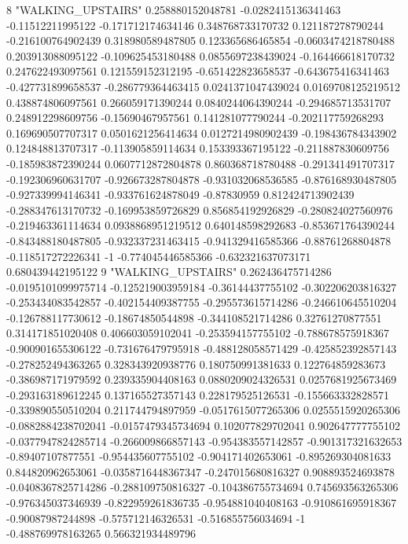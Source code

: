 8 "WALKING_UPSTAIRS" 0.258880152048781 -0.0282415136341463 -0.11512211995122 -0.171712174634146 0.348768733170732 0.121187278790244 -0.216100764902439 0.318980589487805 0.123365686465854 -0.0603474218780488 0.203913088095122 -0.109625453180488 0.0855697238439024 -0.164466618170732 0.247622493097561 0.121559152312195 -0.651422823658537 -0.643675416341463 -0.427731899658537 -0.286779364463415 0.0241371047439024 0.0169708125219512 0.438874806097561 0.266059171390244 0.0840244064390244 -0.294685713531707 0.248912298609756 -0.15690467957561 0.141281077790244 -0.202117759268293 0.169690507707317 0.0501621256414634 0.0127214980902439 -0.198436784343902 0.124848813707317 -0.113905859114634 0.153393367195122 -0.211887830609756 -0.185983872390244 0.0607712872804878 0.860368718780488 -0.291341491707317 -0.192306960631707 -0.926673287804878 -0.931032068536585 -0.876168930487805 -0.927339994146341 -0.933761624878049 -0.87830959 0.812424713902439 -0.288347613170732 -0.169953859726829 0.856854192926829 -0.280824027560976 -0.219463361114634 0.0938868951219512 0.640148598292683 -0.853671764390244 -0.843488180487805 -0.932337231463415 -0.941329416585366 -0.88761268804878 -0.118517272226341 -1 -0.774045446585366 -0.632321637073171 0.680439442195122
9 "WALKING_UPSTAIRS" 0.262436475714286 -0.0195101099975714 -0.125219003959184 -0.36144437755102 -0.302206203816327 -0.253434083542857 -0.402154409387755 -0.295573615714286 -0.246610645510204 -0.126788117730612 -0.18674850544898 -0.344108521714286 0.32761270877551 0.314171851020408 0.406603059102041 -0.253594157755102 -0.788678575918367 -0.900901655306122 -0.731676479795918 -0.488128058571429 -0.425852392857143 -0.278252494363265 0.328343920938776 0.180750991381633 0.122764859283673 -0.386987171979592 0.239335904408163 0.0880209024326531 0.0257681925673469 -0.293163189612245 0.137165527357143 0.228179525126531 -0.155663332828571 -0.339890550510204 0.211744794897959 -0.0517615077265306 0.0255515920265306 -0.0882884238702041 -0.0157479345734694 0.102077829702041 0.902647777755102 -0.0377947824285714 -0.266009866857143 -0.954383557142857 -0.901317321632653 -0.89407107877551 -0.954435607755102 -0.904171402653061 -0.895269304081633 0.844820962653061 -0.0358716448367347 -0.247015680816327 0.908893524693878 -0.0408367825714286 -0.288109750816327 -0.104386755734694 0.745693563265306 -0.976345037346939 -0.822959261836735 -0.954881040408163 -0.910861695918367 -0.90087987244898 -0.575712146326531 -0.516855756034694 -1 -0.488769978163265 0.566321934489796
